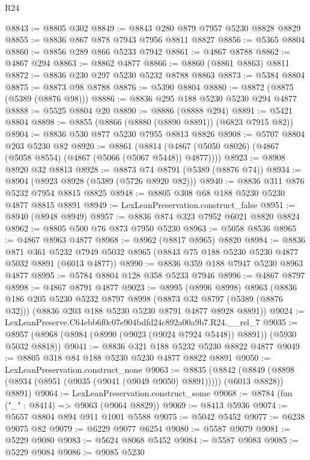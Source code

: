 \begin{lexlean}{R24}
\begin{coremodule}
@8843 := @8805 @302
@8849 := @8843 @280 @879 @7957 @5230 @8828 @8829
@8855 := @8836 @867 @878 @7943 @7956 @8811 @8827
@8856 := @5365 @8804
@8860 := @8856 @289 @866 @5233 @7942
@8861 := @4867 @8788
@8862 := @4867 @294
@8863 := @8862 @4877
@8866 := @8860 (@8861 @8863) @8811
@8872 := @8836 @230 @297 @5230 @5232 @8788 @8863
@8873 := @5384 @8804
@8875 := @8873 @98 @8788
@8876 := @5390 @8804
@8880 := @8872 (@8875 (@5389 (@8876 @98)))
@8886 := @8836 @295 @188 @5230 @5230 @294 @4877
@8888 := @5525 @8804 @20
@8890 := @8886 (@8888 @294)
@8891 := @5421 @8804
@8898 := @8855 (@8866 (@8880 (@8890 @8891)) (@6823 @7915 @82))
@8904 := @8836 @530 @877 @5230 @7955 @8813 @8826
@8908 := @5707 @8804 @203 @5230 @82
@8920 := @8861
    (@8814 (@4867 (@5050 @8026) (@4867 (@5058 @8554) (@4867 (@5066 (@5067 @5448)) @4877))))
@8923 := @8908 @8920 @32 @8813
@8928 := @8873 @74 @8791 (@5389 (@8876 @74))
@8934 := @8904 (@8923 @8928 (@5389 (@5726 @8920 @82)))
@8940 := @8836 @311 @876 @5232 @7954 @8815 @8825
@8948 := @8805 @308 @68 @188 @5230 @5230 @4877 @8815 @8891
@8949 := LexLeanPreservation.construct_false
@8951 := @8940 (@8948 @8949)
@8957 := @8836 @874 @323 @7952 @6021 @8820 @8824
@8962 := @8805 @500 @76 @873 @7950 @5230
@8963 := @5058 @8536
@8965 := @4867 @8963 @4877
@8968 := @8962 (@8817 @8965) @8820
@8984 := @8836
    @871
    @361
    @5232
    @7949
    @5032
    @8965
    (@8843 @75 @188 @5230 @5230 @4877 @5032 @8891 (@6013 @4877))
@8990 := @8836 @359 @188 @7947 @5230 @8963 @4877
@8995 := @5784 @8804 @128 @358 @5233 @7946
@8996 := @4867 @8797
@8998 := @4867 @8791 @4877
@9023 := @8995
    (@8996 @8998)
    @8963
    (@8836
      @186
      @205
      @5230
      @5232
      @8797
      @8998
      (@8873 @32 @8797 (@5389 (@8876 @32)))
      (@8836 @203 @188 @5230 @5230 @8791 @4877 @8928 @8891))
@9024 := LexLeanPreserve.C64ebb6f0c07e904bdfd24c892a00a9b7.R24.__rel_7
@9035 := @8957 (@8968 (@8984 (@8990 (@9023 (@9024 @7924 @5448)) @8891)) (@5930 @5032 @8818))
@9041 := @8836 @321 @188 @5232 @5230 @8822 @4877
@9049 := @8805 @318 @84 @188 @5230 @5230 @4877 @8822 @8891
@9050 := LexLeanPreservation.construct_none
@9063 := @8835
    (@8842 (@8849 (@8898 (@8934 (@8951 (@9035 (@9041 (@9049 @9050) @8891))))) (@6013 @8828)) @8891)
@9064 := LexLeanPreservation.construct_some
@9068 := @8784 (fun ("_" : @8414) => @9063 (@9064 @8829))
@9069 := @8413 @5936
@9074 := @5657 @8804 @894 @911 @1001 @5588
@9075 := @5042 @5452
@9077 := @6238 @9075 @82
@9079 := @6229 @9077 @6254
@9080 := @5587 @9079
@9081 := @5229 @9080
@9083 := @5624 @8068 @5452
@9084 := @5587 @9083
@9085 := @5229 @9084
@9086 := @9085 @5230

\end{coremodule}
\end{lexlean}
